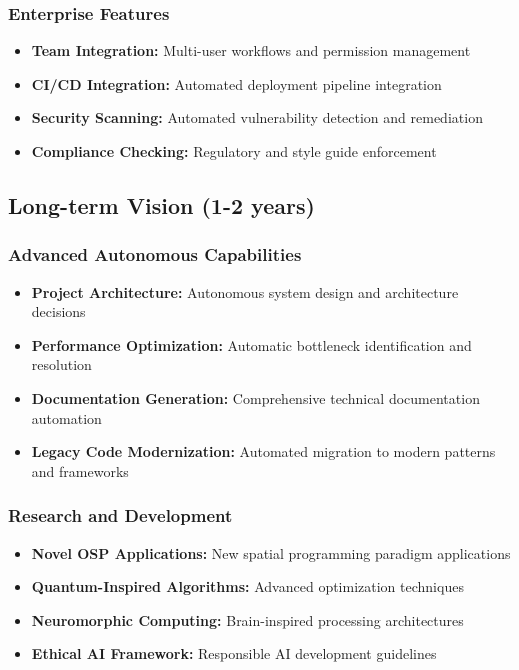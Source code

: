 \documentclass[12pt,a4paper]{article}
\begin{document}
\subsubsection{Enterprise Features}
\begin{itemize}
    \item \textbf{Team Integration:} Multi-user workflows and permission management
    \item \textbf{CI/CD Integration:} Automated deployment pipeline integration
    \item \textbf{Security Scanning:} Automated vulnerability detection and remediation
    \item \textbf{Compliance Checking:} Regulatory and style guide enforcement
\end{itemize}

\subsection{Long-term Vision (1-2 years)}

\subsubsection{Advanced Autonomous Capabilities}
\begin{itemize}
    \item \textbf{Project Architecture:} Autonomous system design and architecture decisions
    \item \textbf{Performance Optimization:} Automatic bottleneck identification and resolution
    \item \textbf{Documentation Generation:} Comprehensive technical documentation automation
    \item \textbf{Legacy Code Modernization:} Automated migration to modern patterns and frameworks
\end{itemize}

\subsubsection{Research and Development}
\begin{itemize}
    \item \textbf{Novel OSP Applications:} New spatial programming paradigm applications
    \item \textbf{Quantum-Inspired Algorithms:} Advanced optimization techniques
    \item \textbf{Neuromorphic Computing:} Brain-inspired processing architectures
    \item \textbf{Ethical AI Framework:} Responsible AI development guidelines
\end{itemize}
\end{document}
